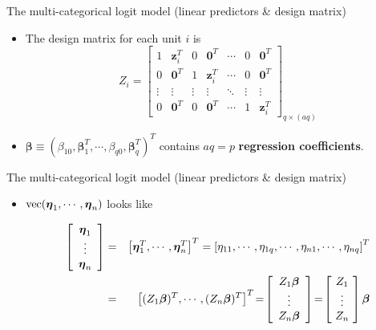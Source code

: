 \documentclass{beamer}
\newcommand{\boldbeta}{{\boldsymbol \beta}}
\newenvironment{wideitemize}%
  {\begin{itemize}%
    \setlength{\parskip}{1em}}%
  {\end{itemize}}
\begin{document}
\begin{frame} {The multi-categorical logit model (linear predictors \& design matrix)}
\begin{wideitemize}
\item
The  design matrix for each unit $i$ is
$$Z_i=\left[\begin{array}{ccccccc}1 & \textbf{z}_i^T & 0 & \textbf{0}^T & \cdots & 0 & \textbf{0}^T \\ 
0 & \textbf{0}^T & 1 & \textbf{z}_i^T & \cdots & 0 & \textbf{0}^T \\
\vdots & \vdots & \vdots & \vdots & \ddots & \vdots & \vdots \\ 0 & \textbf{0}^T & 0 & \textbf{0}^T & 
\cdots & 1 & \textbf{z}_i^T\end{array} \right]_{q\times (aq)}$$

\item $\boldbeta \equiv (\beta_{10}, \boldbeta_1^T, \cdots, \beta_{q0},
\boldbeta_q^T)^T$  contains   $aq = p$ {\bf regression coefficients}.









\end{wideitemize}
\end{frame}

\begin{frame}{The multi-categorical logit model (linear predictors \& design matrix)}
\begin{itemize}

\item $\mbox{vec}(\mbox{\boldmath $\eta$}_1,\cdots,\mbox{\boldmath $\eta$}_n)$ looks like

\begin{eqnarray*}
\left[\begin{array}{cc}\mbox{\boldmath $\eta$}_1 \\ \vdots \\ \mbox{\boldmath $\eta$}_n \end{array} \right]
& = & \left[\mbox{\boldmath $\eta$}_1^T, \cdots, \mbox{\boldmath $\eta$}_n^T\right]^T
=\left[\eta_{11},\cdots,\eta_{1q},\cdots, \eta_{n1},\cdots, \eta_{nq}\right]^T \\
&=& \left[(Z_1\mbox{\boldmath $\beta$})^T, \cdots, (Z_n\mbox{\boldmath $\beta$})^T\right]^T
\!=\!\left[\begin{array}{c} Z_1\mbox{\boldmath $\beta$} \\ \vdots \\ Z_n\mbox{\boldmath $\beta$} \end{array}\right]
\!=\!\left[\!\begin{array}{c} Z_1 \\ \vdots \\ Z_n \end{array}\!\right] \mbox{\boldmath $\beta$}
\end{eqnarray*}
\end{itemize}
\end{frame}
\end{document}
